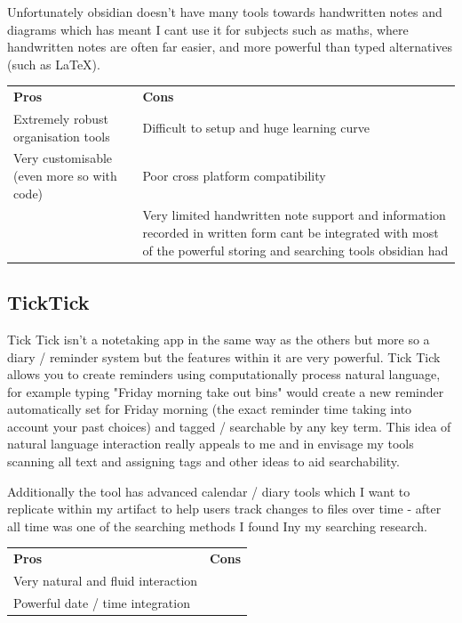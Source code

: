 Unfortunately obsidian doesn’t have many tools towards handwritten notes and diagrams which has meant I cant use it for subjects such as maths, where handwritten notes are often far easier, and more powerful than typed alternatives (such as LaTeX).

\begin{tabularx}{\textwidth}{>{\raggedright\arraybackslash}X>{\raggedright\arraybackslash}X}
    \rowcolor{gray!15} \textbf{Pros}           & \textbf{Cons}                                                             \\ Extremely robust organisation tools   &   Difficult to setup and huge learning curve \\
    Very customisable (even more so with code) & Poor cross platform compatibility                                         \\
                                               & Very limited handwritten note support and information recorded in written form cant be integrated with most of the powerful storing and searching tools obsidian had                                           \\
                                              
\end{tabularx}

\subsection*{TickTick}
Tick Tick isn't a notetaking app in the same way as the others but more so a diary / reminder system but the features within it are very powerful. Tick Tick allows you to create reminders using computationally process natural language, for example typing "Friday morning take out bins" would create a new reminder automatically set for Friday morning (the exact reminder time taking into account your past choices) and tagged / searchable by any key term. This idea of natural language interaction really appeals to me and in envisage my tools scanning all text and assigning tags and other ideas to aid searchability.

Additionally the tool has advanced calendar / diary tools which I want to replicate within my artifact to help users track changes to files over time - after all time was one of the searching methods I found Iny my searching research. 

\begin{tabularx}{\textwidth}{>{\raggedright\arraybackslash}X>{\raggedright\arraybackslash}X}
    \rowcolor{gray!15} \textbf{Pros} & \textbf{Cons}                                                             \\ Very natural and fluid interaction  &    \\
  Powerful date / time integration               &                         \\
                                    
\end{tabularx}


